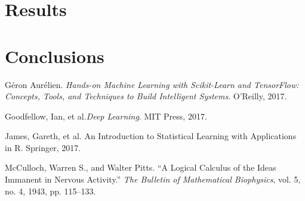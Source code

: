 \documentclass[12pt,letterpaper]{article}
\begin{document}
\section{Results}



\section{Conclusions}



\begin{thebibliography}{9}


Géron Aurélien. \textit{Hands-on Machine Learning with Scikit-Learn and TensorFlow: Concepts, Tools, and Techniques to Build Intelligent Systems}. O'Reilly, 2017.

Goodfellow, Ian, et al.\textit{Deep Learning}. MIT Press, 2017.

James, Gareth, et al. {An Introduction to Statistical Learning with Applications in R}. Springer, 2017.

McCulloch, Warren S., and Walter Pitts. “A Logical Calculus of the Ideas Immanent in Nervous Activity.” \textit{The Bulletin of Mathematical Biophysics}, vol. 5, no. 4, 1943, pp. 115–133.


\end{thebibliography}

\end{document}
